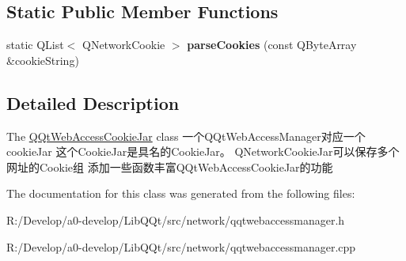 \subsection*{Static Public Member Functions}
\begin{DoxyCompactItemize}
\item 
\mbox{\label{class_q_qt_web_access_cookie_jar_aff377d7b87dfae0d5aa54d843b24ee8f}} 
static Q\+List$<$ Q\+Network\+Cookie $>$ {\bfseries parse\+Cookies} (const Q\+Byte\+Array \&cookie\+String)
\end{DoxyCompactItemize}


\subsection{Detailed Description}
The \mbox{\hyperlink{class_q_qt_web_access_cookie_jar}{Q\+Qt\+Web\+Access\+Cookie\+Jar}} class 一个\+Q\+Qt\+Web\+Access\+Manager对应一个cookie\+Jar 这个\+Cookie\+Jar是具名的\+Cookie\+Jar。 Q\+Network\+Cookie\+Jar可以保存多个网址的\+Cookie组 添加一些函数丰富\+Q\+Qt\+Web\+Access\+Cookie\+Jar的功能 

The documentation for this class was generated from the following files\+:\begin{DoxyCompactItemize}
\item 
R\+:/\+Develop/a0-\/develop/\+Lib\+Q\+Qt/src/network/qqtwebaccessmanager.\+h\item 
R\+:/\+Develop/a0-\/develop/\+Lib\+Q\+Qt/src/network/qqtwebaccessmanager.\+cpp\end{DoxyCompactItemize}
